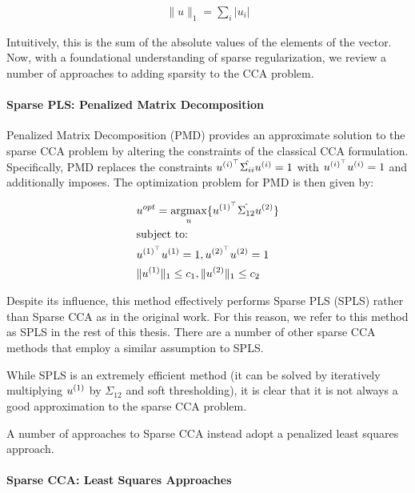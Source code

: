 \begin{align}
    \|u\|_1 = \sum_i |u_i|
\end{align}

Intuitively, this is the sum of the absolute values of the elements of the vector.
Now, with a foundational understanding of sparse regularization, we review a number of approaches to adding sparsity to the CCA problem.

\paragraph{Sparse PLS: Penalized Matrix Decomposition}
Penalized Matrix Decomposition (PMD) \citep{witten2009penalized} provides an approximate solution to the sparse CCA problem by altering the constraints of the classical CCA formulation.
Specifically, PMD replaces the constraints \(u^{(i)^{\top}} \hat{\Sigma_{ii}} u^{(i)} = 1\) with \(u^{(i)^{\top}} u^{(i)}= 1\) and additionally imposes.
The optimization problem for PMD is then given by:

\begin{align}
    & u^{opt}=\underset{u}{\mathrm{argmax}}\{ u^{(1)^{\top}} \hat{\Sigma_{12}} u^{(2)} \} \\
    & \text{subject to:} \notag \\
    & u^{(1)^{\top}} u^{(1)} = 1 , u^{(2)^{\top}} u^{(2)} = 1 \notag \\
    & \|u^{(1)}\|_1 \leq c_1 , \|u^{(2)}\|_1 \leq c_2 \notag
\end{align}

Despite its influence, this method effectively performs Sparse PLS (SPLS) rather than Sparse CCA as in the original work.
For this reason, we refer to this method as SPLS in the rest of this thesis.
There are a number of other sparse CCA methods that employ a similar assumption to SPLS\citep{parkhomenko2009sparse, waaijenborg2008quantifying}.

While SPLS is an extremely efficient method (it can be solved by iteratively multiplying $u^{(1)}$ by $\hat{\Sigma_{12}}$ and soft thresholding), it is clear that it is not always a good approximation to the sparse CCA problem.

A number of approaches to Sparse CCA instead adopt a penalized least squares approach.

\paragraph{Sparse CCA: Least Squares Approaches}

